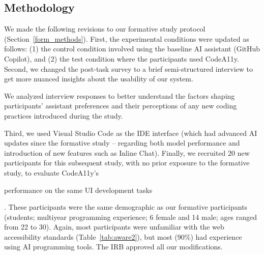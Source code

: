 \subsection{Methodology}
We made the following revisions to our formative study protocol (Section~\ref{form_methods}). First, the experimental conditions were updated as follows: (1) the control condition involved using the baseline AI assistant (GitHub Copilot), and (2) the test condition where the participants used CodeA11y. Second, we changed the post-task survey to a brief semi-structured interview to get more nuanced insights about the usability of our system. \begin{highlight} We analyzed interview responses to better understand the factors shaping participants' assistant preferences and their perceptions of any new coding practices introduced during the study.\end{highlight} Third, we used Visual Studio Code as the IDE interface (which had advanced AI updates since the formative study -- regarding both model performance and introduction of new features such as Inline Chat). Finally, we recruited 20 new participants for this subsequent study, with no prior exposure to the formative study, to evaluate CodeA11y's \begin{highlight}
performance on the same UI development tasks\end{highlight}. These participants were the same demographic as our formative participants (students; multiyear programming experience; 6 female and 14 male; ages ranged from 22 to 30). Again, most participants were unfamiliar with the web accessibility standards (Table~\ref{tab:aware2}), but most (90\%) had experience using AI programming tools. The IRB approved all our modifications.

